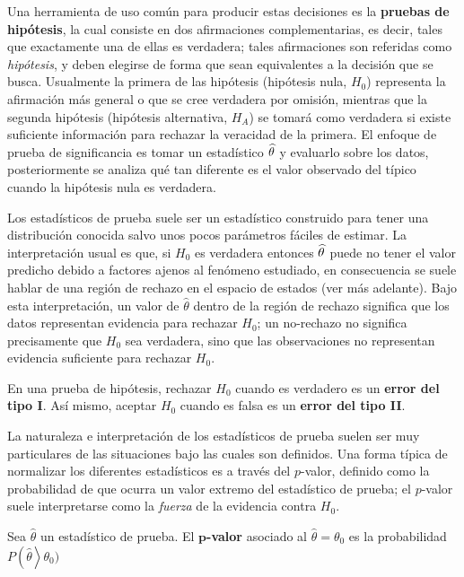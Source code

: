 Una herramienta de uso común para producir estas decisiones es la \textbf{pruebas de hipótesis},
la cual consiste en dos afirmaciones complementarias, es decir, tales que exactamente una de ellas es verdadera; tales afirmaciones
son referidas como \textit{hipótesis}, y deben elegirse de forma que sean equivalentes a la 
decisión que se busca. 
%
Usualmente la primera de las hipótesis (hipótesis nula, $H_0$) representa la afirmación más general o que se cree verdadera por omisión, mientras que la segunda hipótesis (hipótesis alternativa, $H_A$) se tomará como verdadera si
existe suficiente información para rechazar la veracidad de la primera.
%
El enfoque de prueba de significancia es  tomar un estadístico $\widehat{ \theta }$ y evaluarlo sobre los datos, posteriormente se analiza qué tan diferente es el valor observado del típico cuando la hipótesis nula es verdadera.

Los estadísticos de prueba suele ser un estadístico construido para tener una distribución conocida salvo unos pocos parámetros fáciles de estimar.
%
La interpretación usual es que, si $H_0$ es verdadera entonces $\widehat{ \theta }$ puede no tener el valor predicho debido a factores ajenos al fenómeno estudiado, en consecuencia se suele hablar de una región de rechazo en el espacio de estados (ver más adelante).
%
Bajo esta interpretación, un valor de $\widehat{\theta}$ dentro de la región de rechazo significa que los datos representan evidencia para rechazar $H_0$; un no-rechazo no significa precisamente que $H_0$ sea verdadera, sino que las observaciones no representan evidencia suficiente para rechazar $H_0$.

\begin{definicion}
En una prueba de hipótesis, rechazar $H_0$ cuando es verdadero es un \textbf{error del tipo I}. Así mismo, aceptar $H_0$ cuando es falsa es un \textbf{error del tipo II}.
\end{definicion}

La naturaleza e interpretación de los estadísticos de prueba suelen ser muy particulares de las situaciones bajo las cuales son definidos.
%
Una forma típica de normalizar los diferentes estadísticos es a través del $p$-valor, definido como la probabilidad de que ocurra un valor extremo del estadístico de prueba; 
el $p$-valor suele interpretarse como la \textit{fuerza} de la evidencia contra $H_0$.

\begin{definicion}
Sea $\widehat{\theta}$ un estadístico de prueba. El \textbf{$\boldsymbol{p}$-valor} asociado al $\widehat{\theta}=\theta_0$ es la probabilidad $P\left(\widehat{\theta}\right>\theta_0)$
\end{definicion}

